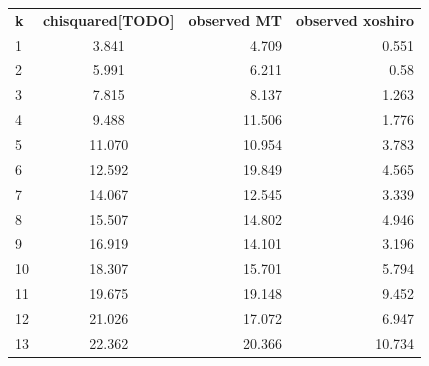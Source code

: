\documentclass[
]{article}
\begin{document}
\begin{table}[]
\begin{tabular}{|l|c|r|r|}
\textbf{k} & \textbf{chisquared[TODO]} &\textbf{observed MT} & \textbf{observed xoshiro} \\
1                              & 3.841           & 4.709                                    & 0.551                                         \\
2                              & 5.991            & 6.211                                    & 0.58                                          \\
3                              & 7.815                          & 8.137                                    & 1.263                                         \\
4                              & 9.488                          & 11.506                       & 1.776                                         \\
5                              & 11.070                          & 10.954                                   & 3.783                                         \\
6                              & 12.592                          & 19.849                                   & 4.565                                         \\ 
7                              & 14.067                          & 12.545                                   & 3.339                                         \\
8                              & 15.507                          & 14.802                                   & 4.946                             \\
9                              & 16.919                           & 14.101                       & 3.196                                         \\
10                             & 18.307                          & 15.701                       & 5.794                                         \\ 
11                             & 19.675                          & 19.148                                   & 9.452                                         \\
12                             & 21.026                         & 17.072                                   & 6.947                                         \\ 
13                             & 22.362              & 20.366                                   & 10.734                            \\

\end{tabular}
\end{table}
\end{document}
